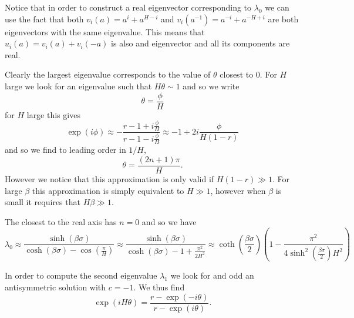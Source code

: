 Notice that in order to construct a real eigenvector corresponding to $\lambda_0$ we can use the fact that both $v_i(a) = a^i + a^{H-i}$ and $v_i(a^{-1}) = a^{-i} + a^{-H+i}$ are both eigenvectors with the same eigenvalue. This means that $u_i(a) = v_i(a) + v_i(-a)$ is also 
and eigenvector and all its components are real. 


Clearly the largest eigenvalue corresponds to the value of $\theta$ closest to $0$.
For $H$ large we look for an eigenvalue such that $H \theta \sim 1$ and so we write
\begin{equation}
    \theta = \frac{\phi}{H}
\end{equation}
for $H$ large this gives
\begin{equation}
    \exp(i\phi) \approx -\frac{r-1+ i\frac{\phi}{H}}{ r-1- i\frac{\phi}{H}}\approx -1 +2 i\frac{\phi}{H(1-r)}
\end{equation}
and so we find to leading order in $1/H$, 
\begin{equation}
    \theta = \frac{(2n+1)\pi}{H}.
\end{equation}
However we notice that this approximation is only valid if $H(1-r) \gg1$. For large $\beta$ this approximation is simply equivalent to $H\gg1$, however when $\beta$ is small it requires
that $H\beta \gg1$.

The closest to the real axis has $n=0$ and so we have
\begin{equation}
    \lambda_0 \approx \frac{\sinh(\beta\sigma)}{\cosh(\beta\sigma) - \cos(\frac{\pi}{H})} \approx     \frac{\sinh(\beta\sigma)}{\cosh(\beta\sigma) - 1+ \frac{\pi^2}{2H^2}} \approx \coth(\frac{\beta\sigma}{2})(1 - \frac{\pi^2}{4\sinh^2(\frac{\beta\sigma}{2}) H^2})
\end{equation}

In order to compute the second eigenvalue $\lambda_1$ we look for and odd an antisymmetric solution with $c=-1$. We thus find
\begin{equation}
    \exp(iH\theta) = \frac{r-\exp(-i\theta)}{r-\exp(i\theta)}.
    \label{theta}
\end{equation}

